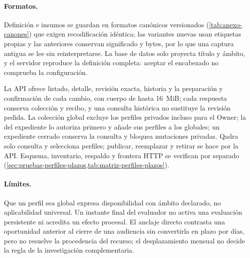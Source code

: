 \paragraph{Formatos.} Definición e insumos se guardan en formatos canónicos versionados (\cref{tab:anexo-canones}) que exigen recodificación idéntica; las variantes nuevas usan etiquetas propias y las anteriores conservan significado y bytes, por lo que una captura antigua se lee sin reinterpretarse. La base de datos solo proyecta título y ámbito, y el servidor reproduce la definición completa: aceptar el encabezado no comprueba la configuración.

La API ofrece listado, detalle, revisión exacta, historia y la preparación y confirmación de cada cambio, con cuerpo de hasta 16~MiB; cada respuesta conserva colección y recibo, y una consulta histórica no sustituye la revisión pedida. La colección global excluye los perfiles privados incluso para el Owner; la del expediente lo autoriza primero y añade sus perfiles a los globales; un expediente cerrado conserva la consulta y bloquea mutaciones privadas. Qadra solo consulta y selecciona perfiles; publicar, reemplazar y retirar se hace por la API. Esquema, inventario, respaldo y frontera HTTP se verifican por separado (\cref{sec:pruebas-perfiles-plazos,tab:matriz-perfiles-plazos}).

\paragraph{Límites.} Que un perfil sea global expresa disponibilidad con ámbito declarado, no aplicabilidad universal. Un instante final del evaluador no activa una evaluación persistente ni acredita un efecto procesal. El anclaje directo contrasta una oportunidad anterior al cierre de una audiencia sin convertirla en plazo por días, pero no resuelve la procedencia del recurso; el desplazamiento mensual no decide la regla de la investigación complementaria.

